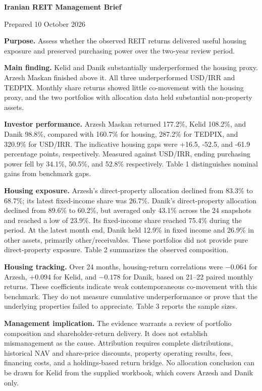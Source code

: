\documentclass[11pt,a4paper]{article}
\begin{document}
{\LARGE\bfseries Iranian REIT Management Brief}\par

Prepared 10 October 2026\par

\textbf{Purpose.} Assess whether the observed REIT returns delivered useful housing exposure and preserved purchasing power over the two-year review period.

\textbf{Main finding.} Kelid and Danik substantially underperformed the housing proxy. Arzesh Maskan finished above it. All three underperformed USD/IRR and TEDPIX. Monthly share returns showed little co-movement with the housing proxy, and the two portfolios with allocation data held substantial non-property assets.

\textbf{Investor performance.} Arzesh Maskan returned 177.2\%, Kelid 108.2\%, and Danik 98.8\%, compared with 160.7\% for housing, 287.2\% for TEDPIX, and 320.9\% for USD/IRR. The indicative housing gaps were +16.5, -52.5, and -61.9 percentage points, respectively. Measured against USD/IRR, ending purchasing power fell by 34.1\%, 50.5\%, and 52.8\% respectively. Table 1 distinguishes nominal gains from benchmark gaps.

\textbf{Housing exposure.} Arzesh's direct-property allocation declined from 83.3\% to 68.7\%; its latest fixed-income share was 26.7\%. Danik's direct-property allocation declined from 89.6\% to 60.2\%, but averaged only 43.1\% across the 24 snapshots and reached a low of 23.9\%. Its fixed-income share reached 75.4\% during the period. At the latest month end, Danik held 12.9\% in fixed income and 26.9\% in other assets, primarily other/receivables. These portfolios did not provide pure direct-property exposure. Table 2 summarizes the observed composition.

\textbf{Housing tracking.} Over 24 months, housing-return correlations were $-0.064$ for Arzesh, $+0.094$ for Kelid, and $-0.178$ for Danik, based on 21--22 paired monthly returns. These coefficients indicate weak contemporaneous co-movement with this benchmark. They do not measure cumulative underperformance or prove that the underlying properties failed to appreciate. Table 3 reports the sample sizes.

\textbf{Management implication.} The evidence warrants a review of portfolio composition and shareholder-return delivery. It does not establish mismanagement as the cause. Attribution requires complete distributions, historical NAV and share-price discounts, property operating results, fees, financing costs, and a holdings-based return bridge. No allocation conclusion can be drawn for Kelid from the supplied workbook, which covers Arzesh and Danik only.
\end{document}
